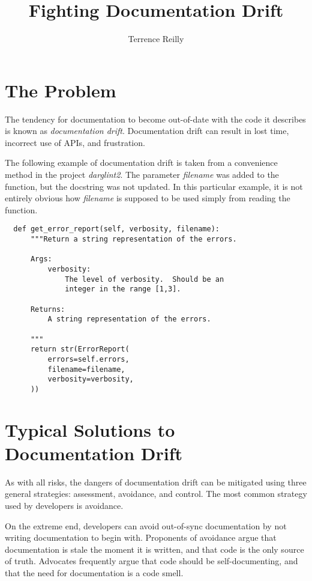 \documentclass[landscape]{sciposter}
\title{\fontfamily{LinuxLibertineT-OsF}\selectfont Fighting Documentation Drift}
\author{Terrence Reilly}
\begin{document}
\maketitle
\begin{multicols}{4}

    \section{The Problem}
        The tendency for documentation to become out-of-date with
        the code it describes is known as \textit{documentation drift}.
        Documentation drift can result in lost time, incorrect use of APIs,
        and frustration.

        The following example of documentation drift is taken from
        a convenience method in the project \textit{darglint2}.  The parameter
        \textit{filename} was added to the function, but the docstring
        was not updated.  In this particular example, it is not entirely
        obvious how \textit{filename} is supposed to be used simply from
        reading the function.

\begin{verbatim}
  def get_error_report(self, verbosity, filename):
      """Return a string representation of the errors.

      Args:
          verbosity:
              The level of verbosity.  Should be an
              integer in the range [1,3].

      Returns:
          A string representation of the errors.

      """
      return str(ErrorReport(
          errors=self.errors,
          filename=filename,
          verbosity=verbosity,
      ))
\end{verbatim}

    \section{Typical Solutions to Documentation Drift}
        As with all risks, the dangers of documentation drift can be
        mitigated using three general strategies: assessment, avoidance,
        and control.  The most common strategy used by developers is
        avoidance.

        On the extreme end, developers can avoid out-of-sync documentation
        by not writing documentation to begin with.  Proponents of avoidance
        argue that documentation is stale the moment it is written, and
        that code is the only source of truth.  Advocates frequently argue
        that code should be self-documenting, and that the need for
        documentation is a code smell.


\end{multicols}
\end{document}
